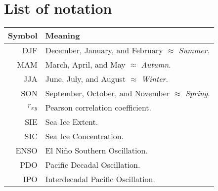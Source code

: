 \chapter{List of notation}
\begin{table}[H]
\begin{tabular}{@{}r|l@{}}
\toprule
\textbf{Symbol} & \textbf{Meaning} \\ \midrule
    DJF & December, January, and February $\approx$ \textit{Summer}. \\
    MAM & March, April, and May $\approx$ \textit{Autumn}. \\
    JJA & June, July, and August $\approx$ \textit{Winter}. \\
    SON & September, October, and November $\approx$ \textit{Spring}. \\
    $r_{xy}$ & Pearson correlation coefficient. \\
    SIE & Sea Ice Extent. \\
    SIC & Sea Ice Concentration. \\
    ENSO & El Ni\~no Southern Oscillation. \\
    PDO & Pacific Decadal Oscillation. \\
    IPO & Interdecadal Pacific Oscillation. \\\bottomrule
\end{tabular}
\end{table}